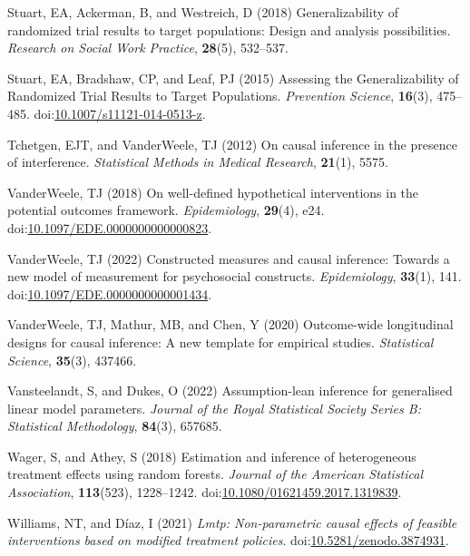 \documentclass[
  singlecolumn]{article}
\newlength{\cslhangindent}
\newenvironment{CSLReferences}[2] %
 {\begin{list}{}{%
  \setlength{\itemindent}{0pt}
  \setlength{\leftmargin}{0pt}
  \setlength{\parsep}{0pt}
  \ifodd #1
   \setlength{\leftmargin}{\cslhangindent}
   \setlength{\itemindent}{-1\cslhangindent}
  \fi
  \setlength{\itemsep}{#2\baselineskip}}}
 {\end{list}}
\begin{document}
\begin{CSLReferences}{1}{0}
Stuart, EA, Ackerman, B, and Westreich, D (2018) Generalizability of
randomized trial results to target populations: Design and analysis
possibilities. \emph{Research on Social Work Practice}, \textbf{28}(5),
532--537.

Stuart, EA, Bradshaw, CP, and Leaf, PJ (2015) Assessing the
Generalizability of Randomized Trial Results to Target Populations.
\emph{Prevention Science}, \textbf{16}(3), 475--485.
doi:\href{https://doi.org/10.1007/s11121-014-0513-z}{10.1007/s11121-014-0513-z}.

Tchetgen, EJT, and VanderWeele, TJ (2012) On causal inference in the
presence of interference. \emph{Statistical Methods in Medical
Research}, \textbf{21}(1), 5575.

VanderWeele, TJ (2018) On well-defined hypothetical interventions in the
potential outcomes framework. \emph{Epidemiology}, \textbf{29}(4), e24.
doi:\href{https://doi.org/10.1097/EDE.0000000000000823}{10.1097/EDE.0000000000000823}.

VanderWeele, TJ (2022) Constructed measures and causal inference:
Towards a new model of measurement for psychosocial constructs.
\emph{Epidemiology}, \textbf{33}(1), 141.
doi:\href{https://doi.org/10.1097/EDE.0000000000001434}{10.1097/EDE.0000000000001434}.

VanderWeele, TJ, Mathur, MB, and Chen, Y (2020) Outcome-wide
longitudinal designs for causal inference: A new template for empirical
studies. \emph{Statistical Science}, \textbf{35}(3), 437466.

Vansteelandt, S, and Dukes, O (2022) Assumption-lean inference for
generalised linear model parameters. \emph{Journal of the Royal
Statistical Society Series B: Statistical Methodology}, \textbf{84}(3),
657685.

Wager, S, and Athey, S (2018) Estimation and inference of heterogeneous
treatment effects using random forests. \emph{Journal of the American
Statistical Association}, \textbf{113}(523), 1228--1242.
doi:\href{https://doi.org/10.1080/01621459.2017.1319839}{10.1080/01621459.2017.1319839}.

Williams, NT, and Díaz, I (2021) \emph{Lmtp: Non-parametric causal
effects of feasible interventions based on modified treatment policies}.
doi:\href{https://doi.org/10.5281/zenodo.3874931}{10.5281/zenodo.3874931}.

\end{CSLReferences}
\end{document}
